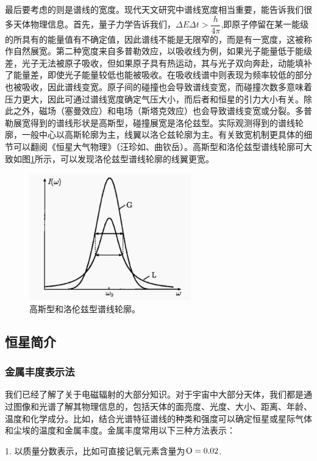 \documentclass[../天体物理基础.tex]{subfiles}
\begin{document}
最后要考虑的则是谱线的宽度。现代天文研究中谱线宽度相当重要，能告诉我们很多天体物理信息。首先，量子力学告诉我们，$\Delta{}E\Delta{}t>\dfrac{h}{4\pi}$,即原子停留在某一能级的所具有的能量值有不确定值，因此谱线不能是无限窄的，而是有一宽度，这被称作自然展宽。第二种宽度来自多普勒效应，以吸收线为例，如果光子能量低于能级差，光子无法被原子吸收，但如果原子具有热运动，其与光子双向奔赴，动能填补了能量差，即使光子能量较低也能被吸收。在吸收线谱中则表现为频率较低的部分也被吸收，因此谱线变宽。原子间的碰撞也会导致谱线变宽，而碰撞次数多意味着压力更大，因此可通过谱线宽度确定气压大小，而后者和恒星的引力大小有关。除此之外，磁场（塞曼效应）和电场（斯塔克效应）也会导致谱线变宽或分裂。多普勒展宽得到的谱线形状是高斯型，碰撞展宽是洛伦兹型。实际观测得到的谱线轮廓，一般中心以高斯轮廓为主，线翼以洛仑兹轮廓为主。有关致宽机制更具体的细节可以翻阅《恒星大气物理》（汪珍如、曲钦岳）。高斯型和洛伦兹型谱线轮廓可大致如图\ref{高斯型和洛伦兹型谱线轮廓。}所示，可以发现洛伦兹型谱线轮廓的线翼更宽。
\begin{figure}[!htbp]
\centering
\includegraphics[width=7cm]{figures/figure1_16.jpg}
\captionsetup{justification=raggedright, singlelinecheck=false}
\caption{高斯型和洛伦兹型谱线轮廓。}
\label{高斯型和洛伦兹型谱线轮廓。}
\end{figure}

\subsection{恒星简介}
\subsubsection{金属丰度表示法}
我们已经了解了关于电磁辐射的大部分知识。对于宇宙中大部分天体，我们都是通过图像和光谱了解其物理信息的，包括天体的面亮度、光度、大小、距离、年龄、温度和化学成分。比如，结合光谱特征谱线的种类和强度可以确定恒星或星际气体和尘埃的温度和金属丰度。金属丰度常用以下三种方法表示：

1. 以质量分数表示，比如可直接记氧元素含量为$\ce{O}=0.02$.
\end{document}
